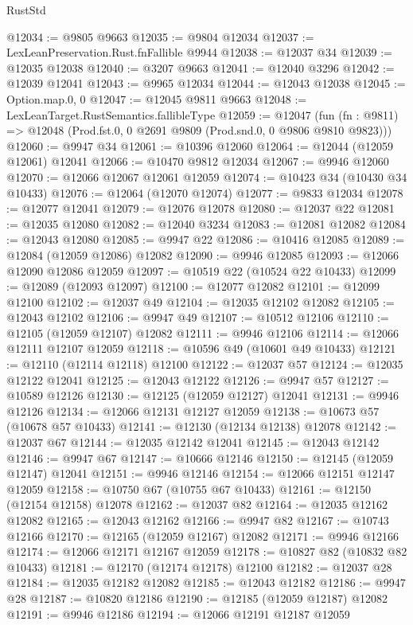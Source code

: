 \begin{lexlean}{RustStd}
\begin{coremodule}
@12034 := @9805 @9663
@12035 := @9804 @12034
@12037 := LexLeanPreservation.Rust.fnFallible @9944
@12038 := @12037 @34
@12039 := @12035 @12038
@12040 := @3207 @9663
@12041 := @12040 @3296
@12042 := @12039 @12041
@12043 := @9965 @12034
@12044 := @12043 @12038
@12045 := Option.map.{0, 0}
@12047 := @12045 @9811 @9663
@12048 := LexLeanTarget.RustSemantics.fallibleType
@12059 := @12047
    (fun (fn : @9811) => @12048 (Prod.fst.{0, 0} @2691 @9809 (Prod.snd.{0, 0} @9806 @9810 @9823)))
@12060 := @9947 @34
@12061 := @10396 @12060
@12064 := @12044 (@12059 @12061) @12041
@12066 := @10470 @9812 @12034
@12067 := @9946 @12060
@12070 := @12066 @12067 @12061 @12059
@12074 := @10423 @34 (@10430 @34 @10433)
@12076 := @12064 (@12070 @12074)
@12077 := @9833 @12034
@12078 := @12077 @12041
@12079 := @12076 @12078
@12080 := @12037 @22
@12081 := @12035 @12080
@12082 := @12040 @3234
@12083 := @12081 @12082
@12084 := @12043 @12080
@12085 := @9947 @22
@12086 := @10416 @12085
@12089 := @12084 (@12059 @12086) @12082
@12090 := @9946 @12085
@12093 := @12066 @12090 @12086 @12059
@12097 := @10519 @22 (@10524 @22 @10433)
@12099 := @12089 (@12093 @12097)
@12100 := @12077 @12082
@12101 := @12099 @12100
@12102 := @12037 @49
@12104 := @12035 @12102 @12082
@12105 := @12043 @12102
@12106 := @9947 @49
@12107 := @10512 @12106
@12110 := @12105 (@12059 @12107) @12082
@12111 := @9946 @12106
@12114 := @12066 @12111 @12107 @12059
@12118 := @10596 @49 (@10601 @49 @10433)
@12121 := @12110 (@12114 @12118) @12100
@12122 := @12037 @57
@12124 := @12035 @12122 @12041
@12125 := @12043 @12122
@12126 := @9947 @57
@12127 := @10589 @12126
@12130 := @12125 (@12059 @12127) @12041
@12131 := @9946 @12126
@12134 := @12066 @12131 @12127 @12059
@12138 := @10673 @57 (@10678 @57 @10433)
@12141 := @12130 (@12134 @12138) @12078
@12142 := @12037 @67
@12144 := @12035 @12142 @12041
@12145 := @12043 @12142
@12146 := @9947 @67
@12147 := @10666 @12146
@12150 := @12145 (@12059 @12147) @12041
@12151 := @9946 @12146
@12154 := @12066 @12151 @12147 @12059
@12158 := @10750 @67 (@10755 @67 @10433)
@12161 := @12150 (@12154 @12158) @12078
@12162 := @12037 @82
@12164 := @12035 @12162 @12082
@12165 := @12043 @12162
@12166 := @9947 @82
@12167 := @10743 @12166
@12170 := @12165 (@12059 @12167) @12082
@12171 := @9946 @12166
@12174 := @12066 @12171 @12167 @12059
@12178 := @10827 @82 (@10832 @82 @10433)
@12181 := @12170 (@12174 @12178) @12100
@12182 := @12037 @28
@12184 := @12035 @12182 @12082
@12185 := @12043 @12182
@12186 := @9947 @28
@12187 := @10820 @12186
@12190 := @12185 (@12059 @12187) @12082
@12191 := @9946 @12186
@12194 := @12066 @12191 @12187 @12059

\end{coremodule}
\end{lexlean}
